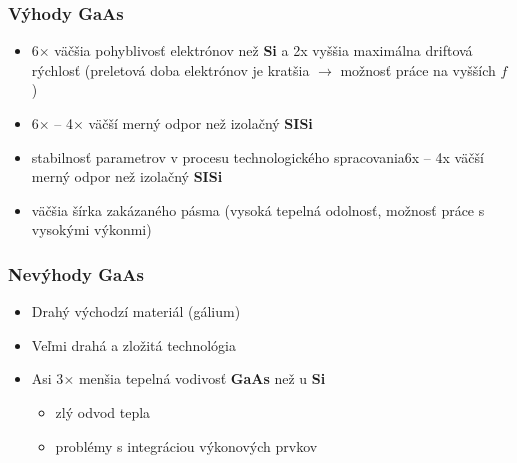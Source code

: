 	\subsubsection{Výhody GaAs}
	\begin{itemize}[label=$\oplus$]
		\item 6$\times$ väčšia pohyblivosť elektrónov než \textbf{Si} a 2x vyššia maximálna driftová rýchlosť (preletová doba elektrónov je kratšia $\rightarrow$ možnosť práce na vyšších $f$)
		\item 6$\times$ -- 4$\times$ väčší merný odpor než izolačný \textbf{SISi}
		\item stabilnosť parametrov v procesu technologického spracovania6x -- 4x väčší merný odpor než izolačný \textbf{SISi}
		\item väčšia šírka zakázaného pásma (vysoká tepelná odolnosť, možnosť práce s vysokými výkonmi)
	\end{itemize}
	
	\subsubsection{Nevýhody GaAs}
	\begin{itemize}[label=$\ominus$]
		\item Drahý východzí materiál (gálium)
		\item Veľmi drahá a zložitá technológia
		\item Asi 3$\times$ menšia tepelná vodivosť \textbf{GaAs} než u \textbf{Si}
			\begin{itemize}[label=$\rightarrow$]
			\item zlý odvod tepla 
			\item problémy s integráciou výkonových prvkov
		\end{itemize} 
	\end{itemize}

